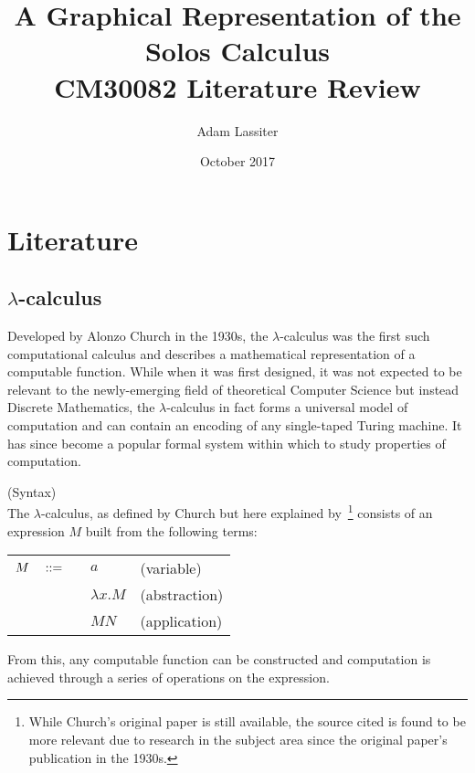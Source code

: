 \documentclass{article}
\title{A Graphical Representation of the Solos Calculus \\
	\large CM30082 Literature Review}
\author{Adam Lassiter}
\date{October 2017}
\begin{document}
\maketitle

\vfill

\tableofcontents

\pagebreak



\section{Literature}

    \subsection{$\lambda$-calculus}

        Developed by Alonzo Church in the 1930s, the $\lambda$-calculus was the first such computational calculus and describes a mathematical representation of a computable function.
        While when it was first designed, it was not expected to be relevant to the newly-emerging field of theoretical Computer Science but instead Discrete Mathematics, the $\lambda$-calculus in fact forms a universal model of computation and can contain an encoding of any single-taped Turing machine.
        It has since become a popular formal system within which to study properties of computation.
        

        \begin{definition}{(Syntax)\\}\label{lambda-calculus}
            The $\lambda$-calculus, as defined by Church but here explained by~\cite{lambda-calculus}\footnote{While Church's original paper is still available, the source cited is found to be more relevant due to research in the subject area since the original paper's publication in the 1930s.} consists of an expression $M$ built from the following terms:
            \begin{center}
                \begin{tabular}{ l l l }
                    $M  \quad ::= \quad$ & $a$               & (variable) \\
                                            & $\lambda x . M$   & (abstraction) \\
                                            & $M N$             & (application)
                \end{tabular}
            \end{center}
        \end{definition}
        From this, any computable function can be constructed and computation is achieved through a series of operations on the expression.
\end{document}
